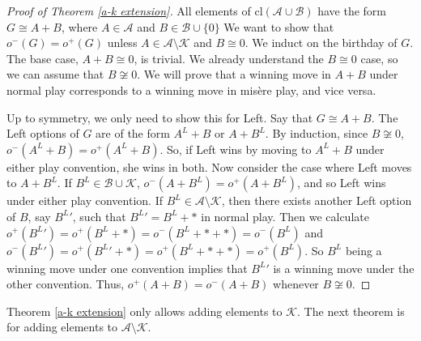 \documentclass{amsart}
\theoremstyle{plain}
\theoremstyle{definition}
\theoremstyle{remark}
\numberwithin{equation}{section}
\numberwithin{thm}{section}
\begin{document}
\begin{proof}[Proof of Theorem \ref{a-k extension}]
     All elements of $\text{cl}(\mathscr{A}\cup \mathscr{B})$ have the form $G \cong A + B$, where $A \in \mathscr{A}$ and $B \in\mathscr{B} \cup \{0\}$ We want to show that $o^-(G) = o^+(G)$ unless $A \in \mathscr{A} \setminus \mathscr{K}$ and $B \cong 0$. We induct on the birthday of $G$. The base case, $A+B \cong 0$, is trivial. We already understand the $B \cong 0$ case, so we can assume that $B \not \cong 0$. We will prove that a winning move in $A+B$ under normal play corresponds to a winning move in mis\`ere play, and vice versa. 
     
     Up to symmetry, we only need to show this for Left. Say that $G \cong A + B$. The Left options of $G$ are of the form $A^L +B$ or $A+B^L$. By induction, since $B \not \cong 0$, $o^-(A^L+B) = o^+(A^L+B)$. So, if Left wins by moving to $A^L+B$ under either play convention, she wins in both. Now consider the case where Left moves to $A+B^L$. If $B^L \in \mathscr{B} \cup  \mathscr{K}$, $o^-(A+B^L)=o^+(A+B^L)$, and so Left wins under either play convention. If $B^L \in \mathscr{A} \setminus \mathscr{K}$, then there exists another Left option of $B$, say ${B^L} '$, such that ${B^L}' = B^L+*$ in normal play. Then we calculate $o^+({B^L}') = o^+(B^L + *) = o^-(B^L+*+*) = o^-(B^L)$ and $o^-({B^L}') =o^+({B^L}' + *) = o^+(B^L+*+*)=o^+(B^L) $. So $B^L$ being a winning move under one convention implies that ${B^L}'$ is a winning move under the other convention. Thus, $o^+(A+B) = o^-(A+B)$ whenever $B \not \cong 0$. 
\end{proof}

Theorem \ref{a-k extension} only allows adding elements to $\mathscr{K}$. The next theorem is for adding elements to $\mathscr{A}\setminus\mathscr{K}$.
\end{document}
